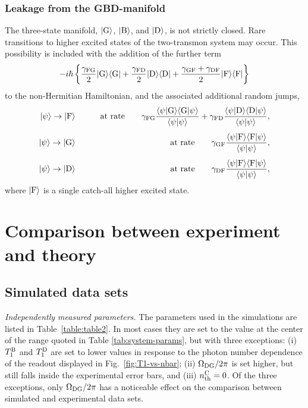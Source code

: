 \documentclass[
						superscriptaddress, 																 amsmath, amssymb,
		 aps,  prb,  
										floatfix,
		linenumbers,
			]{revtex4-1}
\begin{document}
\subsubsection{Leakage from the {\rm GBD}-manifold}
The three-state manifold, $|{\rm G}\rangle$, $|{\rm B}\rangle$, and $|{\rm D}\rangle$, is not strictly closed. Rare transitions to higher excited states of the two-transmon system may occur. This possibility is included with the addition of the further term
\begin{equation}
-i\hbar\left\{\frac{\gamma_{\rm FG}}2|{\rm G}\rangle\langle{\rm G}|+\frac{\gamma_{\rm FD}}2|{\rm D}\rangle\langle{\rm D}|+\frac{\gamma_{\rm GF}+\gamma_{\rm DF}}2|{\rm F}\rangle\langle{\rm F}|\right\}\nonumber
\end{equation}
to the non-Hermitian Hamiltonian, and the associated additional random jumps,
\begin{eqnarray}
|\psi\rangle\to|{\rm F}\rangle&&\qquad\hbox{at rate}\qquad\gamma_{\rm FG}\frac{\langle\psi|{\rm G}\rangle\langle{\rm G}|\psi\rangle}{\langle\psi|\psi\rangle}+\gamma_{\rm FD}\frac{\langle\psi|{\rm D}\rangle\langle{\rm D}|\psi\rangle}{\langle\psi|\psi\rangle},\\
\noalign{\vskip4pt}
|\psi\rangle\to|{\rm G}\rangle&&\qquad\hbox{at rate}\qquad\gamma_{\rm GF}\frac{\langle\psi|{\rm F}\rangle\langle{\rm F}|\psi\rangle}{\langle\psi|\psi\rangle},\\
\noalign{\vskip4pt}
|\psi\rangle\to|{\rm D}\rangle&&\qquad\hbox{at rate}\qquad\gamma_{\rm DF}\frac{\langle\psi|{\rm F}\rangle\langle{\rm F}|\psi\rangle}{\langle\psi|\psi\rangle},
\label{eqn:jumps_to_F}
\end{eqnarray}
where $|{\rm F}\rangle$ is a single catch-all higher excited state.







\section{Comparison between experiment and theory}
\label{sec:Comparison-theory-exp}


\subsection{Simulated data sets}
\textit{Independently measured parameters.}
The parameters used in the simulations are listed in Table~\ref{table:table2}. In most cases they are set to the value at the center of the range quoted in Table \ref{tab:system-params}, but with three exceptions: (i) $T_1^{\rm B}$ and $T_1^{\rm D}$ are set to lower values in response to the photon number dependence of the readout displayed in Fig.~\ref{fig:T1-vs-nbar}; (ii) $\Omega_{\rm DG}/2\pi$ is set higher, but still falls inside the experimental error bars, and (iii) $n_{\rm th}^{\rm C}=0$. Of the three exceptions, only $\Omega_{\rm DG}/2\pi$ has a noticeable effect on the comparison between simulated and experimental data sets.
\end{document}
